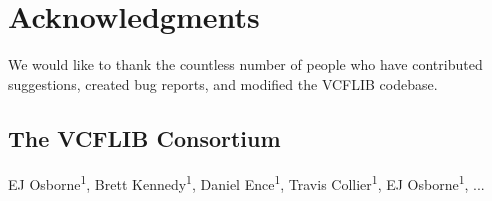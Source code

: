 \documentclass[10pt,letterpaper]{article}
\begin{document}
\section*{Acknowledgments}

We would like to thank the countless number of people who have contributed suggestions, created bug reports, and modified the VCFLIB codebase.  

\subsection*{The VCFLIB Consortium}
\newline
\newline
EJ Osborne\textsuperscript{1},
Brett Kennedy\textsuperscript{1},
Daniel Ence\textsuperscript{1},
Travis Collier\textsuperscript{1},
EJ Osborne\textsuperscript{1},
...
\nolinenumbers
\end{document}
